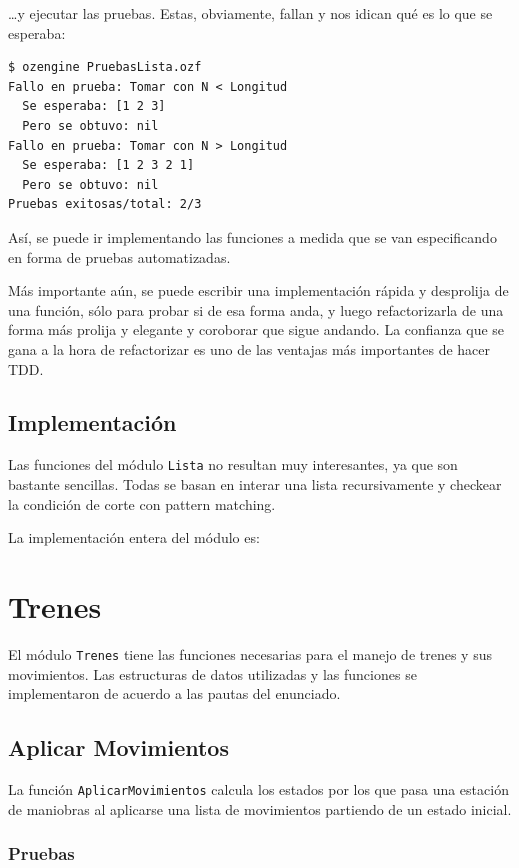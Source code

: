 \documentclass[12pt,titlepage]{article}
\begin{document}
\dots y ejecutar las pruebas. Estas, obviamente, fallan y nos idican qué es lo que se esperaba:
\begin{lstlisting}
$ ozengine PruebasLista.ozf
Fallo en prueba: Tomar con N < Longitud
  Se esperaba: [1 2 3]
  Pero se obtuvo: nil
Fallo en prueba: Tomar con N > Longitud
  Se esperaba: [1 2 3 2 1]
  Pero se obtuvo: nil
Pruebas exitosas/total: 2/3
\end{lstlisting}

Así, se puede ir implementando las funciones a medida que se van especificando en forma de pruebas automatizadas. 

Más importante aún, se puede escribir una implementación rápida y desprolija de una función, sólo para probar si de esa forma anda, y luego refactorizarla de una forma más prolija y elegante y coroborar que sigue andando. La confianza que se gana a la hora de refactorizar es uno de las ventajas más importantes de hacer TDD.

\subsection{Implementación}

Las funciones del módulo \lstinline|Lista| no resultan muy interesantes, ya que son bastante sencillas. Todas se basan en interar una lista recursivamente y checkear la condición de corte con pattern matching.

La implementación entera del módulo es:


\section{Trenes}

El módulo \lstinline|Trenes| tiene las funciones necesarias para el manejo de trenes y sus movimientos. Las estructuras de datos utilizadas y las funciones se implementaron de acuerdo a las pautas del enunciado.

\subsection{Aplicar Movimientos}

La función \lstinline|AplicarMovimientos| calcula los estados por los que pasa una estación de maniobras al aplicarse una lista de movimientos partiendo de un estado inicial.

\subsubsection{Pruebas}
\end{document}
